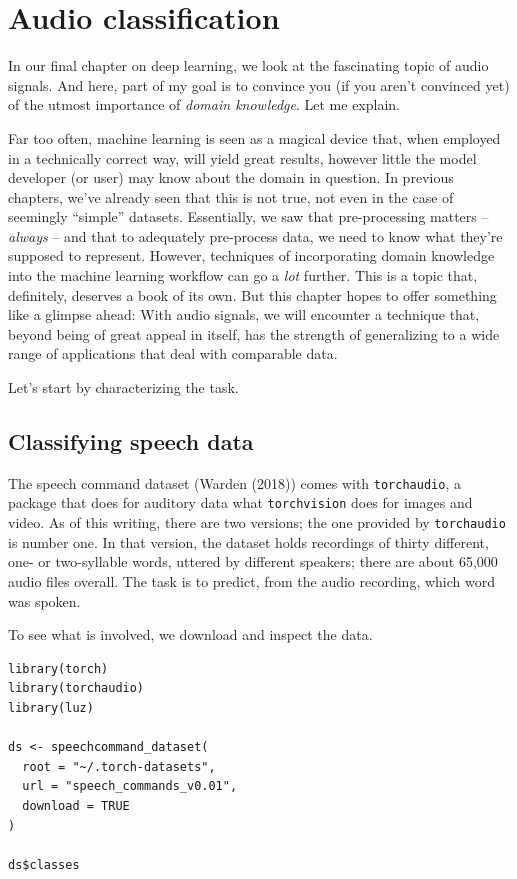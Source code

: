 \documentclass[
  letterpaper,
]{krantz}
\begin{document}
\hypertarget{sec:audio-classification}{%
\chapter{Audio classification}\label{sec:audio-classification}}

In our final chapter on deep learning, we look at the fascinating topic
of audio signals. And here, part of my goal is to convince you (if you
aren't convinced yet) of the utmost importance of \emph{domain
knowledge}. Let me explain.

Far too often, machine learning is seen as a magical device that, when
employed in a technically correct way, will yield great results, however
little the model developer (or user) may know about the domain in
question. In previous chapters, we've already seen that this is not
true, not even in the case of seemingly ``simple'' datasets.
Essentially, we saw that pre-processing matters -- \emph{always} -- and
that to adequately pre-process data, we need to know what they're
supposed to represent. However, techniques of incorporating domain
knowledge into the machine learning workflow can go a \emph{lot}
further. This is a topic that, definitely, deserves a book of its own.
But this chapter hopes to offer something like a glimpse ahead: With
audio signals, we will encounter a technique that, beyond being of great
appeal in itself, has the strength of generalizing to a wide range of
applications that deal with comparable data.

Let's start by characterizing the task.

\hypertarget{classifying-speech-data}{%
\section{Classifying speech data}\label{classifying-speech-data}}

The speech command dataset (Warden (2018)) comes with
\texttt{torchaudio}, a package that does for auditory data what
\texttt{torchvision} does for images and video. As of this writing,
there are two versions; the one provided by \texttt{torchaudio} is
number one. In that version, the dataset holds recordings of thirty
different, one- or two-syllable words, uttered by different speakers;
there are about 65,000 audio files overall. The task is to predict, from
the audio recording, which word was spoken.

To see what is involved, we download and inspect the data.

\begin{verbatim}
library(torch)
library(torchaudio)
library(luz)

ds <- speechcommand_dataset(
  root = "~/.torch-datasets", 
  url = "speech_commands_v0.01",
  download = TRUE
)

ds$classes
\end{verbatim}
\end{document}
